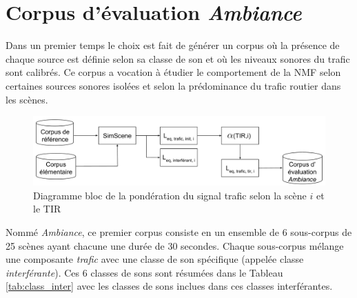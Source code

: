 \section{Corpus d'évaluation \textit{Ambiance}}
\label{part:corpus_ambiance}
Dans un premier temps le choix est fait de générer un corpus où la présence de chaque source est définie selon sa classe de son et où les niveaux sonores du trafic sont calibrés. Ce corpus a vocation à étudier le comportement de la NMF selon certaines sources sonores isolées et selon la prédominance du trafic routier dans les scènes.

\begin{figure}[ht]
\centering
\includegraphics[width=.9\linewidth]{./figures/autres/TIR_ambiance.pdf}
\caption{Diagramme bloc de la pondération du signal trafic selon la scène $i$ et le TIR}
\label{fig:bloc_diagram_tir}
\end{figure}


Nommé \textit{Ambiance}, ce premier corpus consiste en un ensemble de 6 sous-corpus de 25 scènes ayant chacune une durée de 30 secondes. Chaque sous-corpus mélange une composante \textit{trafic} avec une classe de son spécifique (appelée classe \textit{interférante}).
Ces 6 classes de sons sont résumées dans le Tableau \ref{tab:class_inter} avec les classes de sons inclues dans ces classes interférantes.

